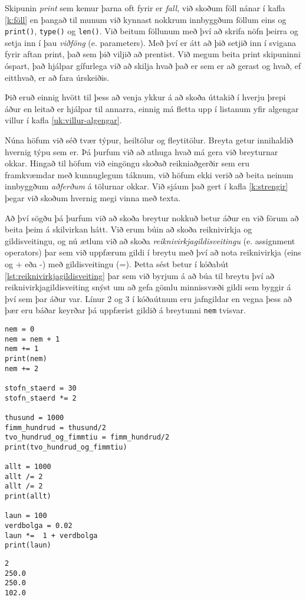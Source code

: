 Skipunin \emph{print} sem kemur þarna oft fyrir er \textit{fall}, við skoðum föll nánar í kafla \ref{k:föll} en þangað til munum við kynnast nokkrum innbyggðum föllum eins og \texttt{print()}, \texttt{type()} og \texttt{len()}.
Við beitum föllunum með því að skrifa nöfn þeirra og setja inn í þau \emph{viðföng} (e. parameters).
Með því er átt að þið setjið inn í svigana fyrir aftan print, það sem þið viljið að prentist.
Við megum beita print skipuninni óspart, það hjálpar gífurlega við að skilja hvað það er sem er að gerast og hvað, ef eitthvað, er að fara úrskeiðis.

Þið eruð einnig hvött til þess að venja ykkur á að skoða úttakið í hverju þrepi áður en leitað er hjálpar til annarra, einnig má fletta upp í listanum yfir algengar villur í kafla \ref{uk:villur-algengar}.


Núna höfum við séð tvær týpur, heiltölur og fleytitölur.
Breyta getur innihaldið hvernig týpu sem er.
Þá þurfum við að athuga hvað má gera við breyturnar okkar.
Hingað til höfum við eingöngu skoðað reikniaðgerðir sem eru framkvæmdar með kunnuglegum táknum, við höfum ekki verið að beita neinum innbyggðum \textit{aðferðum} á tölurnar okkar.
Við sjáum það gert í kafla \ref{k:strengir} þegar við skoðum hvernig megi vinna með texta.

Að því sögðu þá þurfum við að skoða breytur nokkuð betur áður en við förum að beita þeim á skilvirkan hátt.
Við erum búin að skoða reiknivirkja og gildisveitingu, og nú ætlum við að skoða \textit{reiknivirkjagildisveitingu} (e. assignment operators) þar sem við uppfærum gildi í breytu með því að nota reiknivirkja (eins og + eða -) með gildisveitingu (=).
Þetta sést betur í kóðabút \ref{lst:reiknivirkjagildisveiting} þar sem við byrjum á að búa til breytu því að reiknivirkjagildisveiting snýst um að gefa gömlu minnissvæði gildi sem byggir á því sem þar áður var.
Línur 2 og 3 í kóðaútnum eru jafngildar en vegna þess að þær eru báðar keyrðar þá uppfærist gildið á breytunni \texttt{nem} tvisvar.

\begin{lstlisting}[caption="Reiknivirkjagildisveiting", label=lst:reiknivirkjagildisveiting]
nem = 0
nem = nem + 1
nem += 1
print(nem)
nem += 2

stofn_staerd = 30
stofn_staerd *= 2 

thusund = 1000
fimm_hundrud = thusund/2
tvo_hundrud_og_fimmtiu = fimm_hundrud/2
print(tvo_hundrud_og_fimmtiu)

allt = 1000
allt /= 2
allt /= 2
print(allt)

laun = 100
verdbolga = 0.02
laun *=  1 + verdbolga
print(laun)
\end{lstlisting}
\lstset{style=uttak}
\begin{lstlisting}
2
250.0
250.0
102.0
\end{lstlisting}
\lstset{style=venjulegt}

